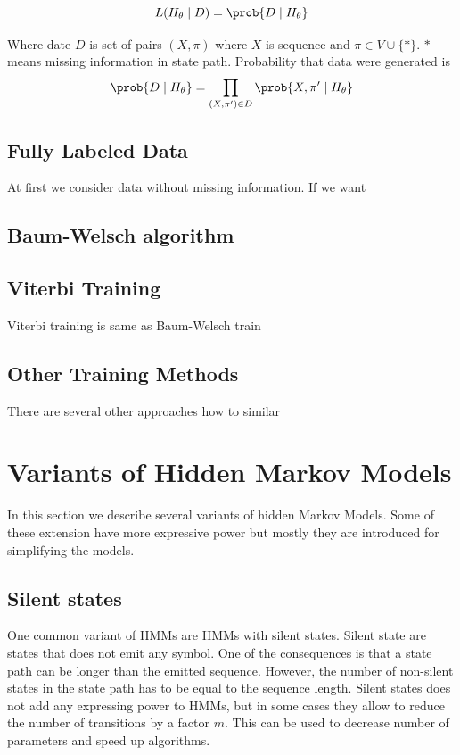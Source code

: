 \[L(H_\theta\mid D)=\prob{D\mid H_\theta}\]

Where date $D$ is set of pairs $(X,\pi)$ where $X$ is sequence and $\pi\in
V\cup\{*\}$. $*$ means missing information in state path. Probability that data
were generated is
\[
\prob{D\mid H_\theta} = \prod_{(X,\pi')\in D}\prob{X,\pi'\mid H_\theta}
\]

\subsection{Fully Labeled Data}
At first we consider data without missing information. If we want  
\subsection{Baum-Welsch algorithm}
\subsection{Viterbi Training}

Viterbi training is same as Baum-Welsch train

\subsection{Other Training Methods}
There are several other approaches how to similar
\section{Variants of Hidden Markov Models}

In this section we describe several variants of hidden Markov Models.
Some of these extension have more expressive power but mostly they are
introduced for simplifying the models.

\subsection{Silent states}

One common variant of HMMs are HMMs with silent states. Silent state are states
that does not emit any symbol. One of the consequences is  that a state path can
be longer than the emitted sequence. However, the number of non-silent states in
the state path has to be equal to the sequence length. Silent states does not
add any expressing power to HMMs, but in some cases they allow to reduce the
number of transitions by a factor $m$. This can be used to decrease number of
parameters and speed up algorithms. 

